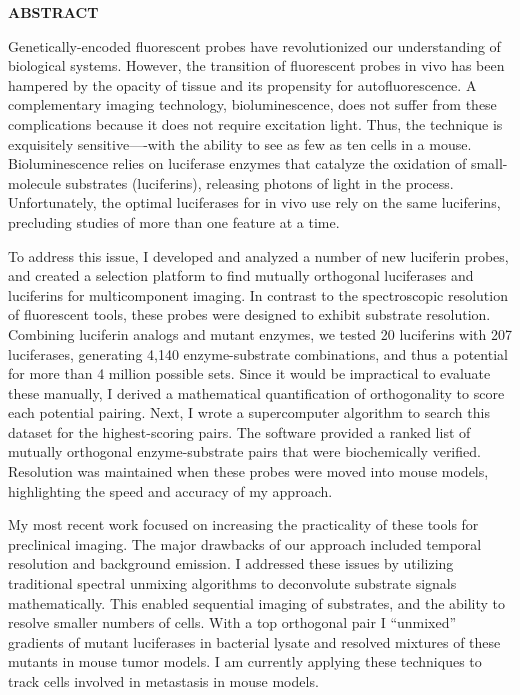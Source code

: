 \documentclass{../latex-F32/F32}
\begin{document}
\begin{center}
{\bf ABSTRACT}
\end{center}

Genetically-encoded fluorescent probes have revolutionized our understanding of biological systems. However, the transition of fluorescent probes in vivo has been hampered by the opacity of tissue and its propensity for autofluorescence. A complementary imaging technology, bioluminescence, does not suffer from these complications because it does not require excitation light. Thus, the technique is exquisitely sensitive—-with the ability to see as few as ten cells in a mouse. Bioluminescence relies on luciferase enzymes that catalyze the oxidation of small-molecule substrates (luciferins), releasing photons of light in the process. Unfortunately, the optimal luciferases for in vivo use rely on the same luciferins, precluding studies of more than one feature at a time.

To address this issue, I developed and analyzed a number of new luciferin probes, and created a selection platform to find mutually orthogonal luciferases and luciferins for multicomponent imaging. In contrast to the spectroscopic resolution of fluorescent tools, these probes were designed to exhibit substrate resolution. Combining luciferin analogs and mutant enzymes, we tested 20 luciferins with 207 luciferases, generating 4,140 enzyme-substrate combinations, and thus a potential for more than 4 million possible sets. Since it would be impractical to evaluate these manually, I derived a mathematical quantification of orthogonality to score each potential pairing. Next, I wrote a supercomputer algorithm to search this dataset for the highest-scoring pairs. The software provided a ranked list of mutually orthogonal enzyme-substrate pairs that were biochemically verified. Resolution was maintained when these probes were moved into mouse models, highlighting the speed and accuracy of my approach.

My most recent work focused on increasing the practicality of these tools for preclinical imaging. The major drawbacks of our approach included temporal resolution and background emission. I addressed these issues by utilizing traditional spectral unmixing algorithms to deconvolute substrate signals mathematically. This enabled sequential imaging of substrates, and the ability to resolve smaller numbers of cells. With a top orthogonal pair I ``unmixed'' gradients of mutant luciferases in bacterial lysate and resolved mixtures of these mutants in mouse tumor models. I am currently applying these techniques to track cells involved in metastasis in mouse models.
\end{document}
